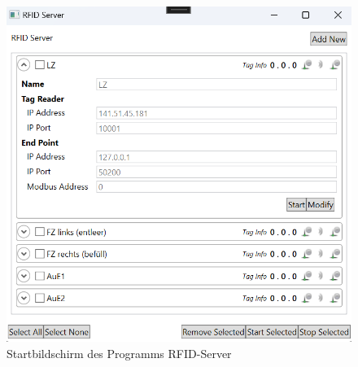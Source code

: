 \begin{figure}
    \caption[Startbildschirm des Programms RFID-Server]
    {\small Startbildschirm des Programms RFID-Server}\label{fig:figure7}
    \includegraphics[height = \textwidth ]{Bilder/RFIDServer_Bildschirm}
    \centering
\end{figure}

